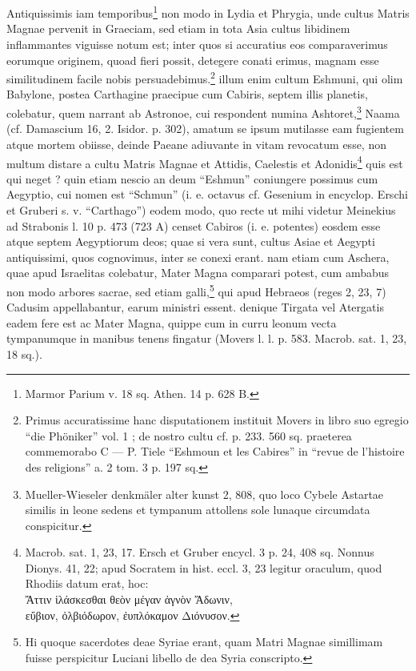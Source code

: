 \documentclass[a4paper, 11pt, oneside, polutonikogreek, german, twocolumn]{article}
\begin{document}
\section*{}
\paragraph{}
Antiquissimis iam temporibus\footnote{Marmor Parium v. 18 sq. Athen. 14 p. 628 B.} non modo in Lydia et Phrygia, unde cultus Matris Magnae pervenit in Graeciam, sed etiam in tota Asia cultus libidinem inflammantes viguisse notum est; inter quos si accuratius eos comparaverimus eorumque originem, quoad fieri possit, detegere conati erimus, magnam esse similitudinem facile nobis persuadebimus.\footnote{Primus accuratissime hanc disputationem instituit Movers in libro suo egregio "`die Phöniker"' vol. 1 ; de nostro cultu cf. p. 233. 560 sq. praeterea commemorabo C --- P. Tiele "`Eshmoun et les Cabires"' in "`revue de l'histoire des religions"' a. 2 tom. 3 p. 197 sq.} illum enim cultum Eshmuni, qui olim Babylone, postea Carthagine praecipue cum Cabiris, septem illis planetis, colebatur, quem narrant ab Astronoe, cui respondent numina Ashtoret,\footnote{Mueller-Wieseler denkmäler alter kunst 2, 808, quo loco Cybele Astartae similis in leone sedens et tympanum attollens sole lunaque circumdata conspicitur.} Naama (cf. Damascium 16, 2. Isidor. p. 302), amatum se ipsum mutilasse eam fugientem atque mortem obiisse, deinde Paeane adiuvante in vitam revocatum esse, non multum distare a cultu Matris Magnae et Attidis, Caelestis et Adonidis\footnote{Macrob. sat. 1, 23, 17. Ersch et Gruber encycl. 3 p. 24, 408 sq. Nonnus Dionys. 41, 22; apud Socratem in hist. eccl. 3, 23 legitur oraculum, quod Rhodiis datum erat, hoc:\\\hspace*{5mm}Ἄττιν ἱλάσκεσθαι θεὸν μέγαν ἁγνὸν Ἄδωνιν,\\\hspace*{5mm}εὔβιον, ὀλβιόδωρον, ἐυπλόκαμον Διόνυσον.} quis est qui neget ? quin etiam nescio an deum "`Eshmun"' coniungere possimus cum Aegyptio, cui nomen est "`Schmun"' (i. e. octavus cf. Gesenium in encyclop. Erschi et Gruberi s. v. "`Carthago"') eodem modo, quo recte ut mihi videtur Meinekius ad Strabonis l. 10 p. 473 (723 A) censet Cabiros (i. e. potentes) eosdem esse atque septem Aegyptiorum deos; quae si vera sunt, cultus Asiae et Aegypti antiquissimi, quos cognovimus, inter se conexi erant. nam etiam cum Aschera, quae apud Israelitas colebatur, Mater Magna comparari potest, cum ambabus non modo arbores sacrae, sed etiam galli,\footnote{Hi quoque sacerdotes deae Syriae erant, quam Matri Magnae simillimam fuisse perspicitur Luciani libello de dea Syria conscripto.} qui apud Hebraeos (reges 2, 23, 7) Cadusim appellabantur, earum ministri essent. denique Tirgata vel Atergatis eadem fere est ac Mater Magna, quippe cum in curru leonum vecta tympanumque in manibus tenens fingatur (Movers l. l. p. 583. Macrob. sat. 1, 23, 18 sq.).
\end{document}
